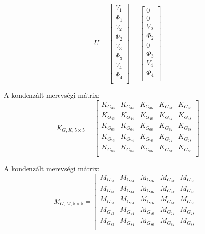 \documentclass{article}
\begin{document}
			\begin{equation}
				U=
				\begin{bmatrix}
				V_{1}    \\
				\Phi_{1} \\
				V_{2}    \\
				\Phi_{2} \\
				V_{3}    \\
				\Phi_{3} \\
				V_{4}    \\
				\Phi_{4} \\
				\end{bmatrix}
				=
				\begin{bmatrix}
				0  \\
				0 \\
				V_{2}    \\
				\Phi_{2} \\
				0   \\
				\Phi_{3} \\
				V_{4}    \\
				\Phi_{4} \\
				\end{bmatrix}
			\end{equation}
			
			A kondenzált merevségi mátrix: 
			\begin{equation}
				K_{G,K,5\times5}=
				\begin{bmatrix}
				K_{G_{33}}	 & K_{G_{34}}	 & K_{G_{36}} & K_{G_{37}}	 & K_{G_{38}}  \\
				K_{G_{43}}	 & K_{G_{44}}	 & K_{G_{46}} & K_{G_{47}}	 & K_{G_{48}}  \\
				K_{G_{63}}	 & K_{G_{64}}	 & K_{G_{66}} & K_{G_{67}}	 & K_{G_{68}}  \\
				K_{G_{73}}	 & K_{G_{74}}	 & K_{G_{76}} & K_{G_{77}}	 & K_{G_{78}}  \\
				K_{G_{83}}	 & K_{G_{84}}	 & K_{G_{86}} & K_{G_{87}}	 & K_{G_{88}}  \\
				\end{bmatrix}
			\end{equation}
			
			A kondenzált merevségi mátrix: 
			\begin{equation}
				M_{G,M,5\times5}=
				\begin{bmatrix}
				M_{G_{33}}	 & M_{G_{34}}	 & M_{G_{36}} & M_{G_{37}}	 & M_{G_{38}}  \\
				M_{G_{43}}	 & M_{G_{44}}	 & M_{G_{46}} & M_{G_{47}}	 & M_{G_{48}}  \\
				M_{G_{63}}	 & M_{G_{64}}	 & M_{G_{66}} & M_{G_{67}}	 & M_{G_{68}}  \\
				M_{G_{73}}	 & M_{G_{74}}	 & M_{G_{76}} & M_{G_{77}}	 & M_{G_{78}}  \\
				M_{G_{83}}	 & M_{G_{84}}	 & M_{G_{86}} & M_{G_{87}}	 & M_{G_{88}}  \\
				\end{bmatrix}
			\end{equation}
			
\end{document}

